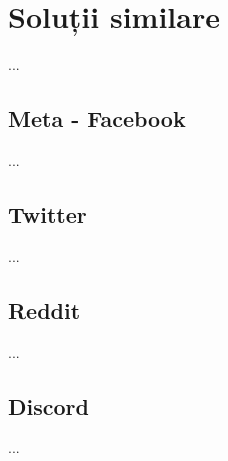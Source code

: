     \section{Soluții similare}
        \label{Soluții similare}
        ...
        \subsection{Meta - Facebook}
        \label{Soluții similare Meta - Facebook}
        ...
        \subsection{Twitter}
        \label{Soluții similare Twitter}
        ...
        \subsection{Reddit}
        \label{Soluții similare Reddit}
        ...
        \subsection{Discord}
        \label{Soluții similare Discord}
        ...
\newpage